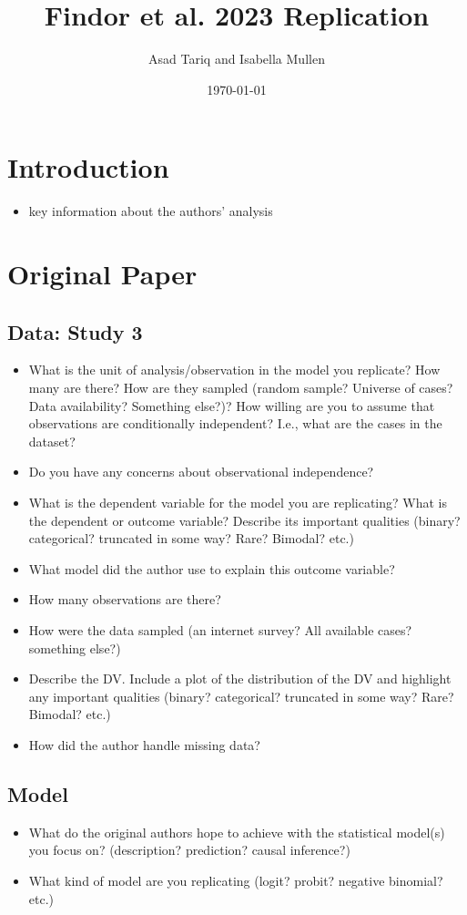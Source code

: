 \documentclass{article}
\title{Findor et al. 2023 Replication}
\author{Asad Tariq and Isabella Mullen}
\date{\today}
\begin{document}
\maketitle

\section{Introduction}
\begin{itemize}
\item key information about the authors’ analysis
\end{itemize}

\section{Original Paper}
\subsection{Data: Study 3}
\begin{itemize}
 \item What is the unit of analysis/observation in the model you replicate?  How many are there?  How are they sampled (random sample?  Universe of cases?  Data availability? Something else?)?  How willing are you to assume that observations are conditionally independent? I.e., what are the cases in the dataset?
\item Do you have any concerns about observational independence?
\item What is the dependent variable for the model you are replicating? What is the dependent or outcome variable? Describe its important qualities (binary?  categorical?  truncated in some way? Rare? Bimodal? etc.)
\item What model did the author use to explain this outcome variable?  
\item How many observations are there?
\item How were the data sampled (an internet survey?  All available cases? something else?)
\item Describe the DV.  Include a plot of the distribution of the DV and highlight any important qualities (binary?  categorical?  truncated in some way? Rare? Bimodal? etc.)
\item How did the author handle missing data?
\end{itemize}

\subsection{Model}
\begin{itemize}
\item What do the original authors hope to achieve with the statistical model(s) you focus on? (description?  prediction? causal inference?)
\item What kind of model are you replicating (logit?  probit?  negative binomial? etc.)
\end{itemize}
\end{document}
